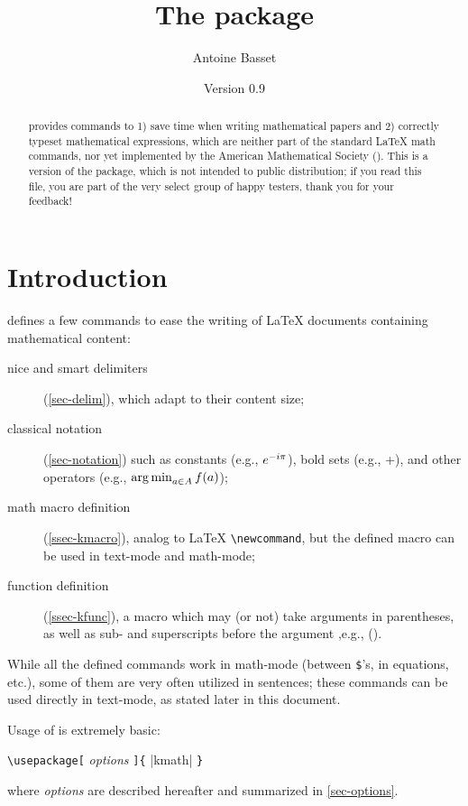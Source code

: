 \documentclass[10pt,a4paper]{article}
\title{The \kmath package}%
\author{Antoine Basset}
\date{Version 0.9}
\begin{document}
\sloppy
\maketitle


\vfill
\begin{abstract}
\kmath provides commands to
1) save time when writing mathematical papers and
2) correctly typeset mathematical expressions, which are neither part of the standard {\LaTeX} math commands, nor yet implemented by the American Mathematical Society (\AmS).
This is a {\textbeta} version of the package, which is not intended to public distribution;
if you read this file, you are part of the very select group of happy testers, thank you for your feedback!
\end{abstract}
\vfill


\section*{Introduction}

\kmath defines a few commands to ease the writing of {\LaTeX} documents containing mathematical content:
\begin{description}
\item[nice and smart delimiters] (\cref{sec-delim}),
which adapt to their content size;
\item[classical notation] (\cref{sec-notation})
such as constants (e.g., $\kexp*(-\kiunit\kpi)$), bold sets (e.g., \kR*+), and other operators (e.g., $\kargmin_{a\in A} f(a)$);
\item[math macro definition] (\cref{ssec-kmacro}),
analog to {\LaTeX} \verb|\newcommand|,
but the defined macro can be used in text-mode and math-mode;
\item[function definition] (\cref{ssec-kfunc}),
a macro which may (or not) take arguments in parentheses, as well as sub- and superscripts before the argument%
{%
,e.g., \myfunc[i][2]().
}
\end{description}

While all the defined commands work in math-mode (between \verb|$|'s, in equations, etc.), some of them are very often utilized in sentences;
these commands can be used directly in text-mode, as stated later in this document.

Usage of \kmath is extremely basic:
\begin{kcode}
\verb|\usepackage[|%
\textit{options}%
\verb|]{|%
{\emphverb|kmath|}%
\verb|}|
\end{kcode}
where \textit{options} are described hereafter and summarized in \cref{sec-options}.
\end{document}
